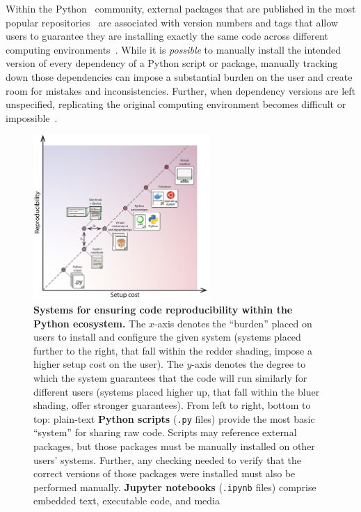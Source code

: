 \documentclass[preprint,12pt,a4paper]{elsarticle}
\begin{document}
Within the Python~\cite{vanR95} community, external packages that are
published in the most popular repositories~\cite{Pyth03, cond15} are
associated with version numbers and tags that allow users to guarantee
they are installing exactly the same code across different computing
environments~\cite{CoghStuf13}. While it is \textit{possible} to
manually install the intended version of every dependency of a Python
script or package, manually tracking down those dependencies can
impose a substantial burden on the user and create room for mistakes
and inconsistencies. Further, when dependency versions are left
unspecified, replicating the original computing environment becomes
difficult or impossible~\citep{PimeEtal19}.

\begin{figure}[tp] \centering
\includegraphics[width=0.6\textwidth]{figs/shareable_code_2d} \caption{\small
\textbf{Systems for ensuring code reproducibility within the Python ecosystem.}
The $x$-axis denotes the ``burden'' placed on users to install and configure
the given system (systems placed further to the right, that fall within the
redder shading, impose a higher setup cost on the user). The $y$-axis denotes
the degree to which the system guarantees that the code will run similarly for
different users (systems placed higher up, that fall within the bluer shading,
offer stronger guarantees). From left to right, bottom to top: plain-text
\textbf{Python scripts} (\texttt{.py} files) provide the most basic ``system''
for sharing raw code. Scripts may reference external packages, but those
packages must be manually installed on other users' systems. Further, any
checking needed to verify that the correct versions of those packages were
installed must also be performed manually. \textbf{Jupyter notebooks}
(\texttt{.ipynb} files) comprise embedded text, executable code, and media
}
\end{figure}
\end{document}
